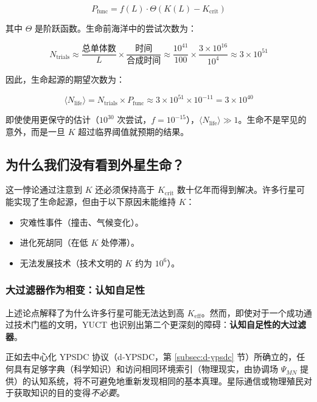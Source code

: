 \documentclass[12pt,a4paper]{article}
\theoremstyle{remark}
\newcommand{\Keffcrit}{K_{\mathrm{crit}}}
\newcommand{\Ntrials}{N_{\mathrm{trials}}}
\newcommand{\Nlife}{\langle N_{\mathrm{life}}\rangle}
\begin{document}
		\begin{equation}
			P_{\text{func}} = f(L) \cdot \Theta(K(L) - K_{\text{crit}})
			\label{eq:Pfunc}
		\end{equation}
		
		其中 $\Theta$ 是阶跃函数。生命前海洋中的尝试次数为：
		
		\begin{equation}
			\Ntrials \approx \frac{\text{总单体数}}{L} \times \frac{\text{时间}}{\text{合成时间}} \approx \frac{10^{41}}{100} \times \frac{3\times 10^{16}}{10^4} \approx 3 \times 10^{51}
			\label{eq:trials}
		\end{equation}
		
		因此，生命起源的期望次数为：
		
		\begin{equation}
			\Nlife = \Ntrials \times P_{\text{func}} \approx 3 \times 10^{51} \times 10^{-11} = 3 \times 10^{40}
			\label{eq:Nlife}
		\end{equation}
		
		即使使用更保守的估计（$10^{30}$ 次尝试，$f=10^{-15}$），$\Nlife \gg 1$。生命不是罕见的意外，而是一旦 $K$ 超过临界阈值就预期的结果。
		
		\subsection{为什么我们没有看到外星生命？}
		
		这一悖论通过注意到 $K$ 还必须保持高于 $\Keffcrit$ 数十亿年而得到解决。许多行星可能实现了生命起源，但由于以下原因未能维持 $K$：
		
		\begin{itemize}
			\item 灾难性事件（撞击、气候变化）。
			\item 进化死胡同（在低 $K$ 处停滞）。
			\item 无法发展技术（技术文明的 $K$ 约为 $10^6$）。
		\end{itemize}
		
		\subsubsection*{大过滤器作为相变：认知自足性}
		
		上述论点解释了为什么许多行星可能无法达到高 $K_{\mathrm{eff}}$。然而，即使对于一个成功通过技术门槛的文明，YUCT 也识别出第二个更深刻的障碍：\textbf{认知自足性的大过滤器}。
		
		正如去中心化 YPSDC 协议（d‑YPSDC，第 \ref{subsec:d-ypsdc} 节）所确立的，任何具有足够字典（科学知识）和访问相同环境索引（物理现实，由协调场 $\Psi_{MN}$ 提供）的认知系统，将不可避免地重新发现相同的基本真理。星际通信或物理殖民对于获取知识的目的变得\emph{不必要}。
		
\end{document}
